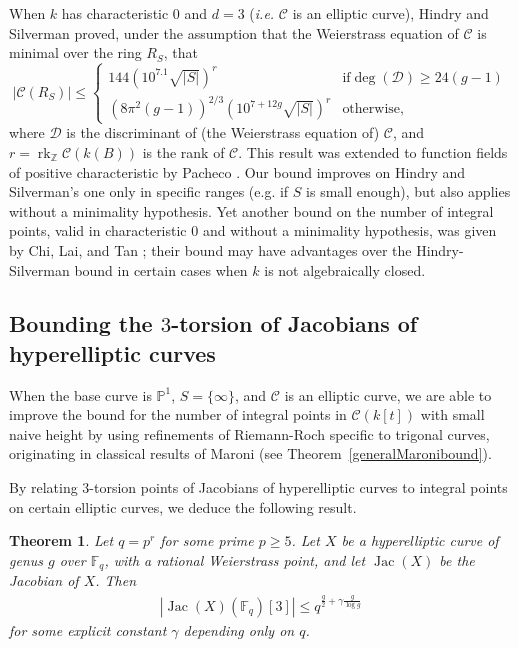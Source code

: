 \documentclass[11pt]{article}
\newcommand{\Z}{\ensuremath{\mathbb{Z}}}
\theoremstyle{plain}
\newtheorem{theorem}{Theorem}[section]
\theoremstyle{definition}
\DeclareMathOperator{\Jac}{Jac}
\DeclareMathOperator{\rk}{rk}
\begin{document}
When $k$ has characteristic $0$ and $d=3$ (\emph{i.e.} $\mathcal{C}$ is an elliptic curve), Hindry and Silverman \cite{HS} proved, under the assumption that the Weierstrass equation of $\mathcal{C}$ is minimal over the ring $R_S$, that
$$
|\mathcal{C}(R_S)| \leq
\left\{
\begin{array}{ll}
144\left(10^{7.1}\sqrt{|S|}\right)^r  & \text{if}\deg(\mathcal{D})\geq 24(g-1) \\
(8\pi^2(g-1))^{2/3}\left(10^{7+12g}\sqrt{|S|}\right)^r & \text{otherwise},
\end{array}\right.
$$
where $\mathcal{D}$ is the discriminant of (the Weierstrass equation of) $\mathcal{C}$, and $r=\rk_\Z \mathcal{C}(k(B))$ is the rank of $\mathcal{C}$. This result was extended to function fields of positive characteristic by Pacheco \cite{pacheco98}.  Our bound improves on Hindry and Silverman's one only in specific ranges (e.g. if $S$ is small enough), but also applies without a minimality hypothesis. Yet another bound on the number of integral points, valid in characteristic 0 and without a minimality hypothesis, was given by Chi, Lai, and Tan \cite{CLT04}; their bound may have advantages over the Hindry-Silverman bound in certain cases when $k$ is not algebraically closed.



\subsection*{Bounding the $3$-torsion of Jacobians of hyperelliptic curves}

When the base curve is $\mathbb{P}^1$, $S=\{\infty\}$, and $\mathcal{C}$ is an elliptic curve, we are able to improve the bound for the number of integral points in $\mathcal{C}(k[t])$ with small naive height by using refinements of Riemann-Roch specific to trigonal curves, originating in classical results of Maroni (see Theorem~\ref{generalMaronibound}).

By relating $3$-torsion points of Jacobians of hyperelliptic curves to integral points on certain elliptic curves, we deduce the following result.


\begin{theorem}
\label{thm:intro3}
Let $q=p^r$ for some prime $p\geq 5$. Let $X$ be a hyperelliptic curve of genus $g$ over $\mathbb{F}_q$, with a rational Weierstrass point, and let $\Jac(X)$ be the Jacobian of $X$. Then
\begin{align*}
|\Jac(X)(\mathbb{F}_q)[3]|\leq q^{\frac{g}{2}+\gamma\frac{g}{\log g}}
\end{align*}
for some explicit constant $\gamma$ depending only on $q$.
\end{theorem}
\end{document}
